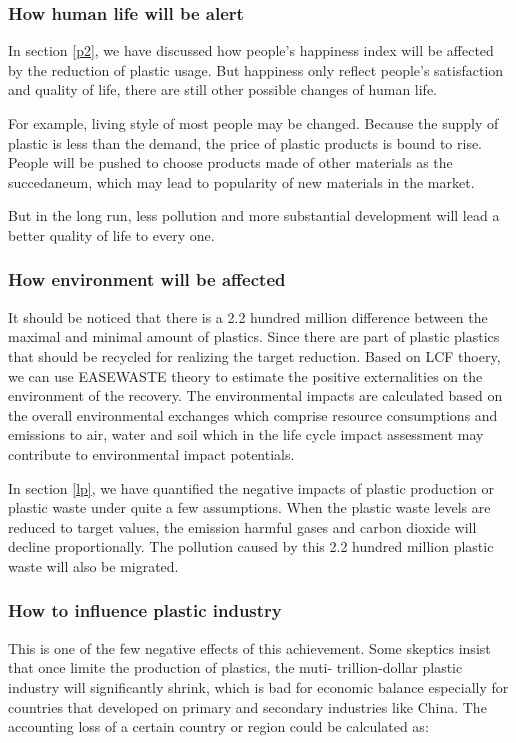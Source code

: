 \documentclass{mcmthesis}
\begin{document}
\subsubsection{How human life will be alert}

In section \ref{p2}, we have discussed how people's happiness index will be affected by the reduction of plastic usage. But happiness only reflect people's satisfaction and quality of life, there are still other possible changes of human life.

For example, living style of most people may be changed. Because the supply of plastic is less than the demand, the price of plastic products is bound to rise. People will be pushed to choose products made of other materials as the succedaneum, which may lead to popularity of new materials in the market. 

But in the long run, less pollution and more substantial development will lead a better quality of life to every one.

\subsubsection{How environment will be affected}

It should be noticed that there is a 2.2 hundred million difference between the maximal and minimal amount of plastics. Since there are part of plastic plastics that should be recycled for realizing the target reduction. Based on LCF thoery, we can use EASEWASTE theory to estimate the positive externalities on the environment of the recovery. The environmental impacts are calculated based on the overall environmental exchanges which comprise resource consumptions and emissions to air, water and soil which in the life cycle impact assessment may contribute to environmental impact potentials\cite{Kirkeby}. 

In section \ref{lp}, we have quantified the negative impacts of plastic production or plastic waste under quite a few assumptions. 
When the plastic waste levels are reduced to target values, the emission harmful gases and carbon dioxide will decline proportionally. The pollution caused by this 2.2 hundred million plastic waste will also be migrated. 

\subsubsection{How to influence plastic industry}

This is one of the few negative effects of this achievement. Some skeptics insist that once limite the production of plastics, the muti- trillion-dollar plastic industry will significantly shrink, which is bad for economic balance especially for countries that developed on primary and secondary industries like China. The accounting loss of a certain country or region could be calculated as:
\end{document}
